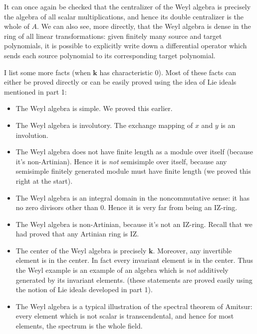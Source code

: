 \documentclass[a4paper]{amsart}
\newcommand{\field}{\mathbf{k}}
\begin{document}
It can once again be checked that the centralizer of the Weyl algebra
is precisely the algebra of all scalar multiplications, and hence its
double centralizer is the whole of $A$. We can also see, more
directly, that the Weyl algebra is dense in the ring of all linear
transformations: given finitely many source and target polynomials, it
is possible to explicitly write down a differential operator which
sends each source polynomial to its corresponding target polynomial.

I list some more facts (when $\field$ has characteristic $0$). Most of
these facts can either be proved directly or can be easily proved
using the idea of Lie ideals mentioned in part 1:

\begin{itemize}

\item The Weyl algebra is simple. We proved this earlier.

\item The Weyl algebra is involutory. The exchange mapping of $x$ and
  $y$ is an involution.

\item The Weyl algebra does not have finite length as a module over
  itself (because it's non-Artinian). Hence it is {\em not} semisimple
  over itself, because any semisimple finitely generated module must
  have finite length (we proved this right at the start).

\item The Weyl algebra is an integral domain in the noncommutative
  sense: it has no zero divisors other than $0$. Hence it is very far
  from being an IZ-ring.

\item The Weyl algebra is non-Artinian, because it's not an
  IZ-ring. Recall that we had proved that any Artinian ring is IZ.

\item The center of the Weyl algebra is precisely $\field$. Moreover,
  any invertible element is in the center. In fact every invariant
  element is in the center. Thus the Weyl example is an example of an
  algebra which is {\em not} additively generated by its invariant
  elements. (these statements are proved easily using the notion of
  Lie ideals developed in part 1).

\item The Weyl algebra is a typical illustration of the spectral
  theorem of Amitsur: every element which is not scalar is
  transcendental, and hence for most elements, the spectrum is the
  whole field.

\end{itemize}
\end{document}
